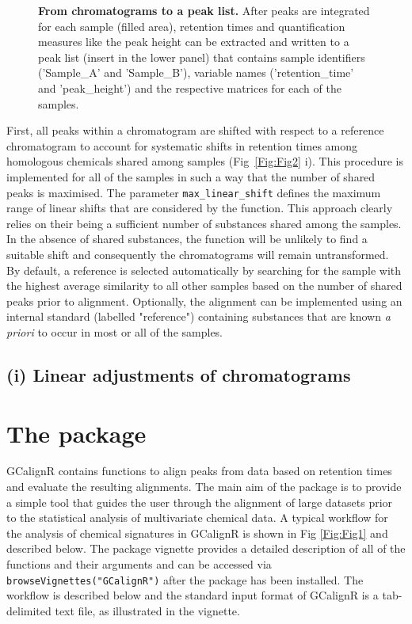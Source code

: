 \documentclass[10pt,letterpaper]{article}
\begin{document}
\begin{figure}[htbp]
\centering
\caption{\textbf{From chromatograms to a peak list.}
After peaks are integrated for each sample (filled area), retention times and quantification measures like the peak height can be extracted and written to a peak list (insert in the lower panel) that contains sample identifiers ('Sample\_A' and 'Sample\_B'), variable names ('retention\_time' and 'peak\_height') and the respective matrices for each of the samples.} 
\label{Fig:Fig1B}
\end{figure}

First, all peaks within a chromatogram are shifted with respect to a reference chromatogram to account for systematic shifts in retention times among homologous chemicals shared among samples (Fig~\ref{Fig:Fig2} i). This procedure is implemented for all of the samples in such a way that the number of shared peaks is maximised. The parameter \texttt{max\_linear\_shift} defines the maximum range of linear shifts that are considered by the function. This approach clearly relies on their being a sufficient number of substances shared among the samples. In the absence of shared substances, the function will be unlikely to find a suitable shift and consequently the chromatograms will remain untransformed. By default, a reference is selected automatically by searching for the sample with the highest average similarity to all other samples based on the number of shared peaks prior to alignment. Optionally, the alignment can be implemented using an internal standard (labelled "reference") containing substances that are known \textit{a priori} to occur in most or all of the samples.

\subsection*{(i) Linear adjustments of chromatograms}






\section*{The package}
GCalignR contains functions to align peaks from   data based on retention times and evaluate the resulting alignments. The main aim of the package is to provide a simple tool that guides the user through the alignment of large datasets prior to the statistical analysis of multivariate chemical data.  A typical workflow for the analysis of chemical signatures in GCalignR is shown in Fig \ref{Fig:Fig1} and described below. The package vignette provides a detailed description of all of the functions and their arguments and can be accessed via \texttt{browseVignettes("GCalignR")} after the package has been installed. The workflow is described below and the standard input format of GCalignR is a tab-delimited text file, as illustrated in the vignette.
\end{document}
